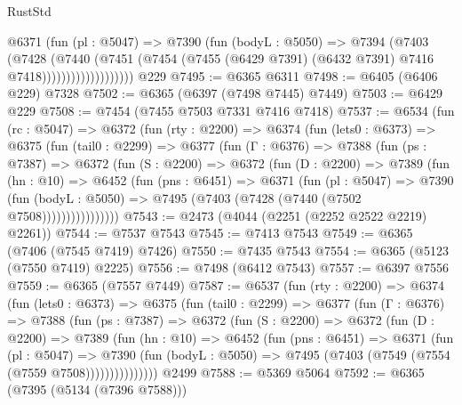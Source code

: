\begin{lexlean}{RustStd}
\begin{coremodule}
                        @6371
                          (fun (pl : @5047) =>
                          @7390
                            (fun (bodyL : @5050) =>
                            @7394
                              (@7403
                                (@7428
                                  (@7440
                                    (@7451
                                      (@7454
                                        (@7455
                                          (@6429 @7391)
                                          (@6432 @7391)
                                          @7416
                                          @7418)))))))))))))))))))
    @229
@7495 := @6365 @6311
@7498 := @6405 (@6406 @229) @7328
@7502 := @6365 (@6397 (@7498 @7445) @7449)
@7503 := @6429 @229
@7508 := @7454 (@7455 @7503 @7331 @7416 @7418)
@7537 := @6534
    (fun (rc : @5047) =>
    @6372
      (fun (rty : @2200) =>
      @6374
        (fun (lets0 : @6373) =>
        @6375
          (fun (tail0 : @2299) =>
          @6377
            (fun (Γ : @6376) =>
            @7388
              (fun (ps : @7387) =>
              @6372
                (fun (S : @2200) =>
                @6372
                  (fun (D : @2200) =>
                  @7389
                    (fun (hn : @10) =>
                    @6452
                      (fun (pns : @6451) =>
                      @6371
                        (fun (pl : @5047) =>
                        @7390
                          (fun (bodyL : @5050) =>
                          @7495 (@7403 (@7428 (@7440 (@7502 @7508))))))))))))))))
@7543 := @2473 (@4044 (@2251 (@2252 @2522 @2219) @2261))
@7544 := @7537 @7543
@7545 := @7413 @7543
@7549 := @6365 (@7406 (@7545 @7419) @7426)
@7550 := @7435 @7543
@7554 := @6365 (@5123 (@7550 @7419) @2225)
@7556 := @7498 (@6412 @7543)
@7557 := @6397 @7556
@7559 := @6365 (@7557 @7449)
@7587 := @6537
    (fun (rty : @2200) =>
    @6374
      (fun (lets0 : @6373) =>
      @6375
        (fun (tail0 : @2299) =>
        @6377
          (fun (Γ : @6376) =>
          @7388
            (fun (ps : @7387) =>
            @6372
              (fun (S : @2200) =>
              @6372
                (fun (D : @2200) =>
                @7389
                  (fun (hn : @10) =>
                  @6452
                    (fun (pns : @6451) =>
                    @6371
                      (fun (pl : @5047) =>
                      @7390
                        (fun (bodyL : @5050) =>
                        @7495 (@7403 (@7549 (@7554 (@7559 @7508)))))))))))))))
    @2499
@7588 := @5369 @5064
@7592 := @6365 (@7395 (@5134 (@7396 @7588)))

\end{coremodule}
\end{lexlean}
